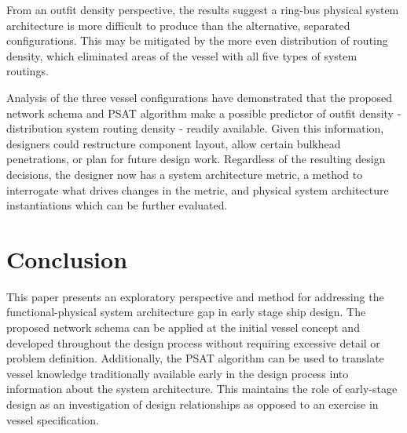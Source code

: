\documentclass[preprint,12pt]{elsarticle}
\begin{document}
From an outfit density perspective, the results suggest a ring-bus physical system architecture is more difficult to produce than the alternative, separated configurations. This may be mitigated by the more even distribution of routing density, which eliminated areas of the vessel with all five types of system routings. 

Analysis of the three vessel configurations have demonstrated that the proposed network schema and PSAT algorithm make a possible predictor of outfit density - distribution system routing density - readily available. Given this information, designers could restructure component layout, allow certain bulkhead penetrations, or plan for future design work. Regardless of the resulting design decisions, the designer now has a system architecture metric, a method to interrogate what drives changes in the metric, and physical system architecture instantiations which can be further evaluated. 


\section{Conclusion}

This paper presents an exploratory perspective and method for addressing the functional-physical system architecture gap in early stage ship design. The proposed network schema can be applied at the initial vessel concept and developed throughout the design process without requiring excessive detail or problem definition. Additionally, the PSAT algorithm can be used to translate vessel knowledge traditionally available early in the design process into information about the system architecture. This maintains the role of early-stage design as an investigation of design relationships as opposed to an exercise in vessel specification. 
\end{document}
